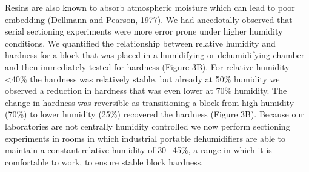 \documentclass{article}
\begin{document}
Resins are also known to absorb atmospheric moisture which can lead to poor embedding (Dellmann and Pearson, 1977). We had anecdotally observed that serial sectioning experiments were more error prone under higher humidity conditions. We quantified the relationship between relative humidity and hardness for a block that was placed in a humidifying or dehumidifying chamber and then immediately tested for hardness (Figure 3B). For relative humidity <40\% the hardness was relatively stable, but already at 50\% humidity we observed a reduction in hardness that was even lower at 70\% humidity. The change in hardness was reversible as transitioning a block from high humidity (70\%) to lower humidity (25\%) recovered the hardness (Figure 3B). Because our laboratories are not centrally humidity controlled we now perform sectioning experiments in rooms in which industrial portable dehumidifiers are able to maintain a constant relative humidity of 30−45\%, a range in which it is comfortable to work, to ensure stable block hardness.
\end{document}
